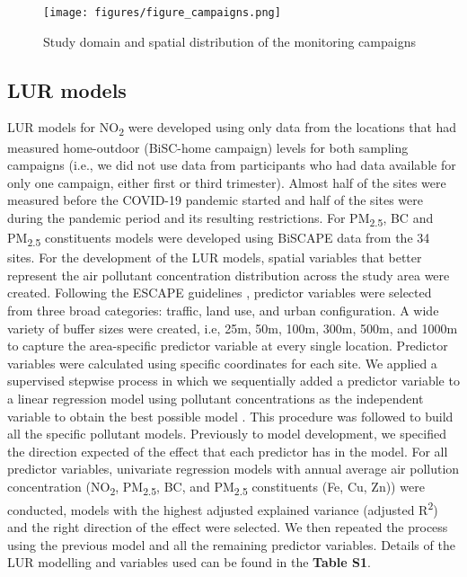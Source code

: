 \documentclass{article}
\begin{document}
\captionsetup[figure]{skip=0pt}
\begin{figure}[!htb]
\texttt{[image: figures/figure\_campaigns.png]}
\caption{Study domain and spatial distribution of the monitoring campaigns}
\label{fig1}
\end{figure}



\subsection{LUR models}

LUR models for NO\textsubscript{2}  were developed using only data from the locations that had measured home-outdoor (BiSC-home campaign) levels for both sampling campaigns (i.e., we did not use data from participants who had data available for only one campaign, either first or third trimester). Almost half of the sites were measured before the COVID-19 pandemic started and half of the sites were during the pandemic period and its resulting restrictions. For PM\textsubscript{2.5}, BC  and PM\textsubscript{2.5} constituents models were developed using BiSCAPE data from the 34 sites. For the development of the LUR models, spatial variables that better represent the air pollutant concentration distribution across the study area were created. Following the ESCAPE guidelines \cite{eeftens2012, beelen2013},  predictor variables were selected from three broad categories: traffic, land use, and urban configuration. A wide variety of buffer sizes were created, i.e, 25m, 50m, 100m, 300m, 500m, and 1000m to capture the area-specific predictor variable at every single location. Predictor variables were calculated using specific coordinates for each site. We applied a supervised stepwise process in which we sequentially added a predictor variable to a linear regression model using pollutant concentrations as the independent variable to obtain the best possible model \cite{eeftens2012, beelen2013}. This procedure was followed to build all the specific pollutant models. Previously to model development, we specified the direction expected of the effect that each predictor has in the model. For all predictor variables, univariate regression models with annual average air pollution concentration (NO\textsubscript{2}, PM\textsubscript{2.5}, BC, and PM\textsubscript{2.5} constituents (Fe, Cu, Zn)) were conducted, models with the highest adjusted explained variance (adjusted R\textsuperscript{2}) and the right direction of the effect were selected. We then repeated the process using the previous model and all the remaining predictor variables. Details of the LUR modelling and variables used can be found in the \textbf{Table S1}.
\end{document}
